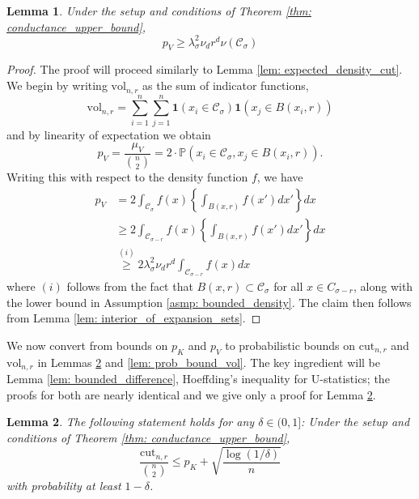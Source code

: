 \documentclass{article}
\newcommand{\vol}{\mathrm{vol}}
\newcommand{\1}{\mathbf{1}}
\newcommand{\cut}{\mathrm{cut}}
\newcommand{\Pbb}{\mathbb{P}}
\newcommand{\Cset}{\mathcal{C}}
\newcommand{\Csig}{\Cset_{\sigma}}
\theoremstyle{aldenthm}
\newtheorem{lemma}{Lemma}
\begin{document}
\begin{lemma}
	\label{lem: expected_density_volume}
	Under the setup and conditions of Theorem \ref{thm: conductance_upper_bound},
	\begin{equation*}
	p_V \geq \lambda_{\sigma}^2 \nu_d r^d \nu(\Csig)
	\end{equation*}
\end{lemma}
\begin{proof}
	The proof will proceed similarly to Lemma \ref{lem: expected_density_cut}. We begin by writing $\vol_{n,r}$ as the sum of indicator functions,
	\begin{equation}
	\label{eqn: volume_expansion}
	\vol_{n,r} = \sum_{i = 1}^{n} \sum_{j = 1}^{n} \1(x_i \in \Csig) \1(x_j \in B(x_i, r))
	\end{equation}
	and by linearity of expectation we obtain
	\begin{equation*}
	p_V = \frac{\mu_V}{{n \choose 2}} = 2 \cdot \Pbb(x_i \in \Csig, x_j \in B(x_i,r)).
	\end{equation*}
	Writing this with respect to the density function $f$, we have
	\begin{align*}
	p_V & = 2 \int_{\Csig} f(x) \left\{ \int_{B(x,r)} f(x') dx' \right\} dx \\
	& \geq 2 \int_{\Cset_{\sigma - r}} f(x) \left\{ \int_{B(x,r)} f(x') dx' \right\} dx \\
	& \overset{(i)}{\geq} 2 \lambda_{\sigma}^2 \nu_d r^d \int_{\Cset_{\sigma - r}} f(x) dx
	\end{align*}
	where $(i)$ follows from the fact that $B(x,r) \subset \Csig$ for all $x \in C_{\sigma - r}$, along with the lower bound in Assumption \ref{asmp: bounded_density}. The claim then follows from Lemma \ref{lem: interior_of_expansion_sets}.
\end{proof}

We now convert from bounds on $p_K$ and $p_V$ to probabilistic bounds on $\cut_{n,r}$ and $\vol_{n,r}$ in Lemmas \ref{lem: prob_bound_cut} and \ref{lem: prob_bound_vol}. The key ingredient will be Lemma \ref{lem: bounded_difference}, Hoeffding's inequality for U-statistics; the proofs for both are nearly identical and we give only a proof for Lemma \ref{lem: prob_bound_cut}.

\begin{lemma}
	\label{lem: prob_bound_cut}
	The following statement holds for any $\delta \in (0,1]$: Under the setup and conditions of Theorem \ref{thm: conductance_upper_bound}, 
	\begin{equation}
	\label{eqn: numerator_additive_bound}
	\frac{\cut_{n,r}}{{n \choose 2}} \leq p_K + \sqrt{\frac{\log(1/\delta)}{n}}
	\end{equation}
	with probability at least $1 - \delta$. 
\end{lemma}
\end{document}
